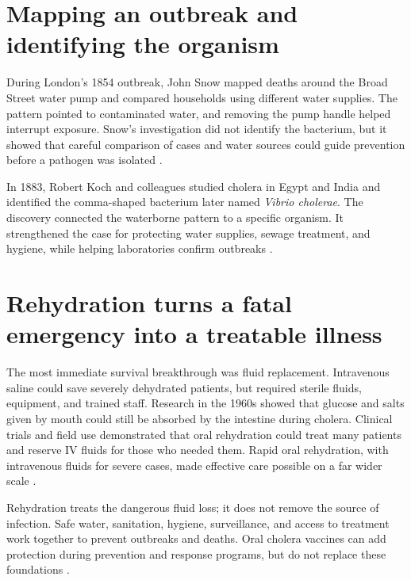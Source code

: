 \documentclass[12pt,oneside]{book}
\begin{document}
\section{Mapping an outbreak and identifying the organism}
During London's 1854 outbreak, John Snow mapped deaths around the Broad Street
water pump and compared households using different water supplies. The pattern
pointed to contaminated water, and removing the pump handle helped interrupt
exposure. Snow's investigation did not identify the bacterium, but it showed
that careful comparison of cases and water sources could guide prevention
before a pathogen was isolated \cite{snowcholera}.

In 1883, Robert Koch and colleagues studied cholera in Egypt and India and
identified the comma-shaped bacterium later named \emph{Vibrio cholerae}.
The discovery connected the waterborne pattern to a specific organism. It
strengthened the case for protecting water supplies, sewage treatment, and
hygiene, while helping laboratories confirm outbreaks
\cite{whoCholera2026}.

\section{Rehydration turns a fatal emergency into a treatable illness}
The most immediate survival breakthrough was fluid replacement. Intravenous
saline could save severely dehydrated patients, but required sterile fluids,
equipment, and trained staff. Research in the 1960s showed that glucose and
salts given by mouth could still be absorbed by the intestine during cholera.
Clinical trials and field use demonstrated that oral rehydration could treat
many patients and reserve IV fluids for those who needed them. Rapid oral
rehydration, with intravenous fluids for severe cases, made effective care
possible on a far wider scale \cite{nalin1968,mahalanabisRefugees,whoCholera2026}.

Rehydration treats the dangerous fluid loss; it does not remove the source of
infection. Safe water, sanitation, hygiene, surveillance, and access to
treatment work together to prevent outbreaks and deaths. Oral cholera vaccines
can add protection during prevention and response programs, but do not replace
these foundations \cite{whoCholera2026}.
\end{document}
